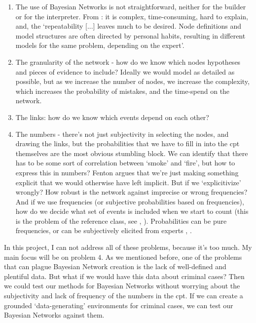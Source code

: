 \begin{enumerate}
\item The use of Bayesian Networks is not straightforward, neither for the builder or for the interpreter. From \citet{deKoeijer2020}: it is complex, time-consuming, hard to explain, and, the `repeatability [...] leaves much to be desired. Node definitions and model structures are often directed by personal habits, resulting in different models for the same problem, depending on the expert'.
\item The granularity of the network - how do we know which nodes hypotheses and pieces of evidence to include? Ideally we would model as detailed as possible, but as we increase the number of nodes, we increase the complexity, which increases the probability of mistakes, and the time-spend on the network.
\item The links: how do we know which events depend on each other?
\item The numbers - there's not just subjectivity in selecting the nodes, and drawing the links, but the probabilities that we have to fill in into the cpt themselves are the most obvious stumbling block. We can identify that there has to be some sort of correlation between `smoke' and `fire', but how to express this in numbers? Fenton argues that we're just making something explicit that we would otherwise have left implicit. But if we `explicitivize' wrongly? How robust is the network against imprecise or wrong frequencies? And if we use frequencies (or subjective probabilities based on frequencies), how do we decide what set of events is included when we start to count (this is the problem of the reference class, see \citep{Allan2007}, \citep{colyvan2001}). Probabilities can be pure frequencies, or can be subjectively elicited from experts \citep{renooij2001}, \citep{Druzdzel2000}.
\end{enumerate}


In this project, I can not address all of these problems, because it's too much. My main focus will be on problem 4. As we mentioned before, one of the problems that can plague Bayesian Network creation is the lack of well-defined and plentiful data. But what if we would have this data about criminal cases? Then we could test our methods for Bayesian Networks without worrying about the subjectivity and lack of frequency of the numbers in the cpt. If we can create a grounded `data-generating' environments for criminal cases, we can test our Bayesian Networks against them.

